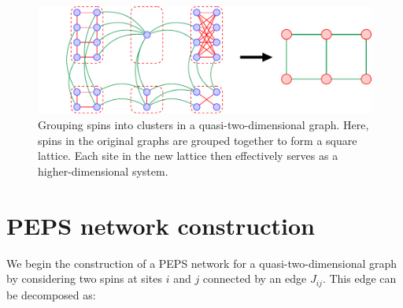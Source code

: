 \begin{figure}
  \includegraphics[width=\textwidth]{figures/clustering}
  \caption{Grouping spins into clusters in a quasi-two-dimensional graph. Here, spins in
    the original graphs are grouped together to form a square lattice. Each site in
    the new lattice then effectively serves as a higher-dimensional system.}
  \label{fig:clustering}
\end{figure}



\section{PEPS network construction}
We begin the construction of a PEPS network for a quasi-two-dimensional graph
by considering two spins at sites $i$ and $j$ connected by an edge $J_{ij}$.
This edge can be decomposed as:

